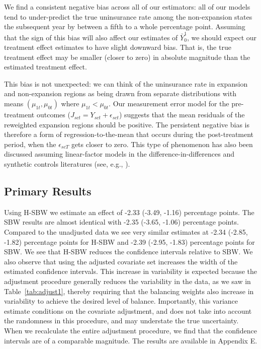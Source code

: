 \documentclass[aoas]{imsart}
\theoremstyle{plain}
\theoremstyle{remark}
\begin{document}
We find a consistent negative bias across all of our estimators: all of our models tend to under-predict the true uninsurance rate among the non-expansion states the subsequent year by between a fifth to a whole percentage point. Assuming that the sign of this bias will also affect our estimates of $\bar{Y}^1_0$, we should expect our treatment effect estimates to have slight downward bias. That is, the true treatment effect may be smaller (closer to zero) in absolute magnitude than the estimated treatment effect. 

This bias is not unexpected: we can think of the uninsurance rate in expansion and non-expansion regions as being drawn from separate distributions with means $(\mu_{1t}, \mu_{0t})$ where $\mu_{1t} < \mu_{0t}$. Our measurement error model for the pre-treatment outcomes ($J_{sct} = Y_{sct} + \epsilon_{sct}$) suggests that the mean residuals of the reweighted expansion regions should be positive. The persistent negative bias is therefore a form of regression-to-the-mean that occurs during the post-treatment period, when the $\epsilon_{scT}$ gets closer to zero. This type of phenomenon has also been discussed assuming linear-factor models in the difference-in-differences and synthetic controls literatures (see, e.g., \cite{daw2018matching}). 

\subsection{Primary Results}

Using H-SBW we estimate an effect of -2.33 (-3.49, -1.16) percentage points. The SBW results are almost identical with -2.35 (-3.65, -1.06) percentage points. Compared to the unadjusted data we see very similar estimates at -2.34 (-2.85, -1.82) percentage points for H-SBW and -2.39 (-2.95, -1.83) percentage points for SBW. We see that H-SBW reduces the confidence intervals relative to SBW. We also observe that using the adjusted covariate set increases the width of the estimated confidence intervals. This increase in variability is expected because the adjustment procedure generally reduces the variability in the data, as we saw in Table~\ref{tab:adjust1}, thereby requiring that the balancing weights also increase in variability to achieve the desired level of balance. Importantly, this variance estimate conditions on the covariate adjustment, and does not take into account the randomness in this procedure, and may understate the true uncertainty. When we recalculate the entire adjustment procedure, we find that the confidence intervals are of a comparable magnitude. The results are available in Appendix E.
\end{document}
